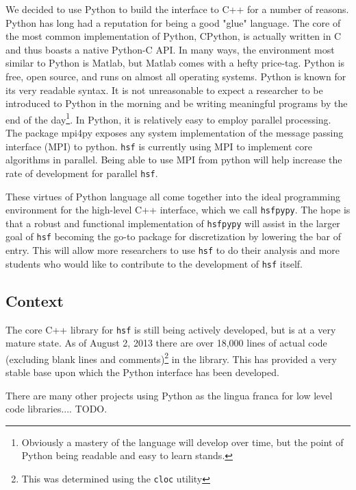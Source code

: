     We decided to use Python to build the interface to C++ for a number of reasons. Python has long had a reputation for being a good "glue" language. The core of the most common implementation of Python, CPython, is actually written in C and thus boasts a native Python-C API. In many ways, the environment most similar to Python is Matlab, but Matlab comes with a hefty price-tag. Python is free, open source, and runs on almost all operating systems. Python is known for its very readable syntax. It is not unreasonable to expect a researcher to be introduced to Python in the morning and be writing meaningful programs by the end of the day\footnote{Obviously a mastery of the language will develop over time, but the point of Python being readable and easy to learn stands.}. In Python, it is relatively easy to employ parallel processing. The package mpi4py exposes any system implementation of the message passing interface (MPI) to python. \texttt{hsf} is currently using MPI to implement core algorithms in parallel. Being able to use MPI from python will help increase the rate of development for parallel \texttt{hsf}.

    These virtues of Python language all come together into the ideal programming environment for the high-level C++ interface, which we call \texttt{hsfpypy}. The hope is that a robust and functional implementation of \texttt{hsfpypy} will assist in the larger goal of \texttt{hsf} becoming the go-to package for discretization by lowering the bar of entry. This will allow more researchers to use \texttt{hsf} to do their analysis and more students who would like to contribute to the development of \texttt{hsf} itself.

  \subsection{Context} \label{ssec:context}

    The core C++ library for \texttt{hsf} is still being actively developed, but is at a very mature state. As of August 2, 2013 there are over 18,000 lines of actual code (excluding blank lines and comments)\footnote{This was determined using the \texttt{cloc} utility} in the library. This has provided a very stable base upon which the Python interface has been developed.


    There are many other projects using Python as the lingua franca for low level code libraries.... TODO.

